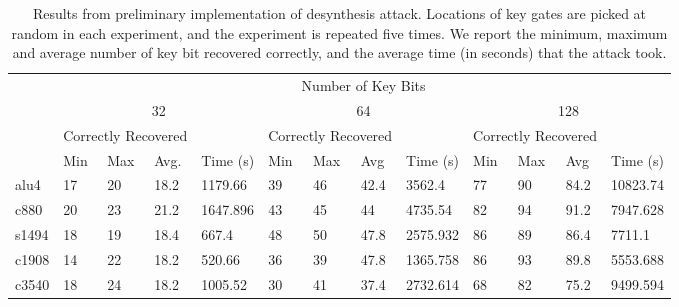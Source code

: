 \begin{table}[ht]
\centering
\caption{Results from preliminary implementation of desynthesis attack. Locations of key gates are 
picked at random in each experiment, and the experiment is repeated five times. We report the minimum, maximum and average number of key bit recovered correctly, and the average time (in seconds) that the attack took.}
\label{my-label}
\begin{tabular}{|l|l|l|l|l|l|l|l|l|l|l|l|l|}
\hline
\multirow{4}{*}{} & \multicolumn{12}{c|}{Number of Key Bits}                                                                                                                        \\ \cline{2-13} 
                  & \multicolumn{4}{c|}{32}                             & \multicolumn{4}{c|}{64}                             & \multicolumn{4}{c|}{128}                            \\ \cline{2-13} 
                  & \multicolumn{3}{l|}{Correctly Recovered} &          & \multicolumn{3}{l|}{Correctly Recovered} &          & \multicolumn{3}{l|}{Correctly Recovered} &          \\ \cline{2-13} 
                  & Min         & Max         & Avg.         & Time (s) & Min         & Max         & Avg          & Time (s) & Min         & Max         & Avg          & Time (s) \\ \hline
alu4              & 17          & 20          & 18.2         &     1179.66     & 39          & 46          & 42.4         &      3562.4    & 77          & 90          & 84.2         &    10823.74      \\ \hline
c880              & 20          & 23          & 21.2         &      1647.896    & 43          & 45          & 44           &    4735.54      & 82          & 94          & 91.2         &    7947.628      \\ \hline
s1494             & 18          & 19          & 18.4         &      667.4    & 48          & 50          & 47.8         &    2575.932      & 86          & 89          & 86.4         & 7711.1         \\ \hline
c1908             & 14          & 22          & 18.2         &      520.66    & 36          & 39          & 47.8         &    1365.758     & 86          & 93          & 89.8         & 5553.688         \\ \hline
c3540             & 18          & 24          & 18.2         &      1005.52    & 30          & 41          & 37.4         &    2732.614     & 68          & 82          & 75.2         & 9499.594         \\ \hline
\end{tabular}
\end{table}

